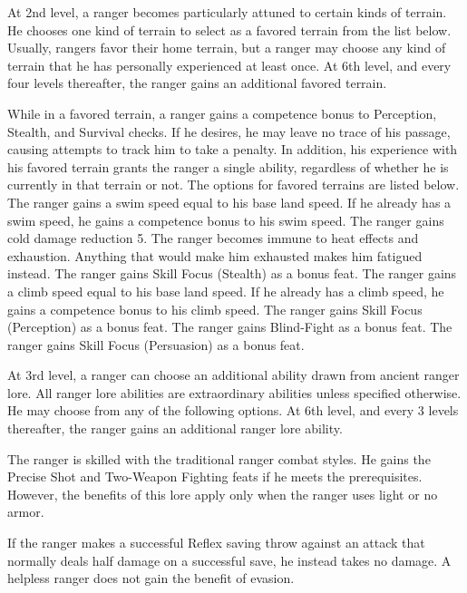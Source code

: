  At 2nd level, a ranger becomes particularly attuned to certain kinds of terrain. He chooses one kind of terrain to select as a favored terrain from the list below. Usually, rangers favor their home terrain, but a ranger may choose any kind of terrain that he has personally experienced at least once. At 6th level, and every four levels thereafter, the ranger gains an additional favored terrain.
\par While in a favored terrain, a ranger gains a  competence bonus to Perception, Stealth, and Survival checks. If he desires, he may leave no trace of his passage, causing attempts to track him to take a  penalty. In addition, his experience with his favored terrain grants the ranger a single ability, regardless of whether he is currently in that terrain or not. The options for favored terrains are listed below.
 The ranger gains a swim speed equal to his base land speed. If he already has a swim speed, he gains a  competence bonus to his swim speed.
 The ranger gains cold damage reduction 5.
 The ranger becomes immune to heat effects and exhaustion. Anything that would make him exhausted makes him fatigued instead.
 The ranger gains Skill Focus (Stealth) as a bonus feat.
 The ranger gains a climb speed equal to his base land speed. If he already has a climb speed, he gains a  competence bonus to his climb speed.
 The ranger gains Skill Focus (Perception) as a bonus feat.
 The ranger gains Blind-Fight as a bonus feat.
 The ranger gains Skill Focus (Persuasion) as a bonus feat.

 At 3rd level, a ranger can choose an additional ability drawn from ancient ranger lore. All ranger lore abilities are extraordinary abilities unless specified otherwise. He may choose from any of the following options. At 6th level, and every 3 levels thereafter, the ranger gains an additional ranger lore ability.

 The ranger is skilled with the traditional ranger combat styles. He gains the Precise Shot and Two-Weapon Fighting feats if he meets the prerequisites. However, the benefits of this lore apply only when the ranger uses light or no armor.

 If the ranger makes a successful Reflex saving throw against an attack that normally deals half damage on a successful save, he instead takes no damage. A helpless ranger does not gain the benefit of evasion.

